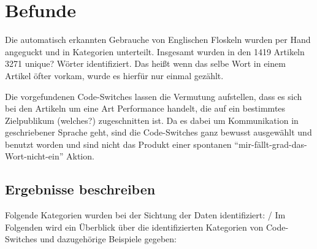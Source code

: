 \section{Befunde}


Die automatisch erkannten Gebrauche von Englischen Floskeln wurden per Hand angeguckt und in Kategorien unterteilt.
Insgesamt wurden in den 1419 Artikeln 3271 unique? Wörter identifiziert.
Das heißt wenn das selbe Wort in einem Artikel öfter vorkam, wurde es hierfür nur einmal gezählt.


Die vorgefundenen Code-Switches lassen die Vermutung aufstellen, dass es sich bei den Artikeln um eine Art Performance handelt, die auf ein bestimmtes Zielpublikum (welches?) zugeschnitten ist.
Da es dabei um Kommunikation in geschriebener Sprache geht, sind die Code-Switches ganz bewusst ausgewählt und benutzt worden und sind nicht das Produkt einer spontanen ``mir-fällt-grad-das-Wort-nicht-ein'' Aktion.


\subsection{Ergebnisse beschreiben}

Folgende Kategorien wurden bei der Sichtung der Daten identifiziert: / Im Folgenden wird ein Überblick über die identifizierten Kategorien von Code-Switches und dazugehörige Beispiele gegeben:



